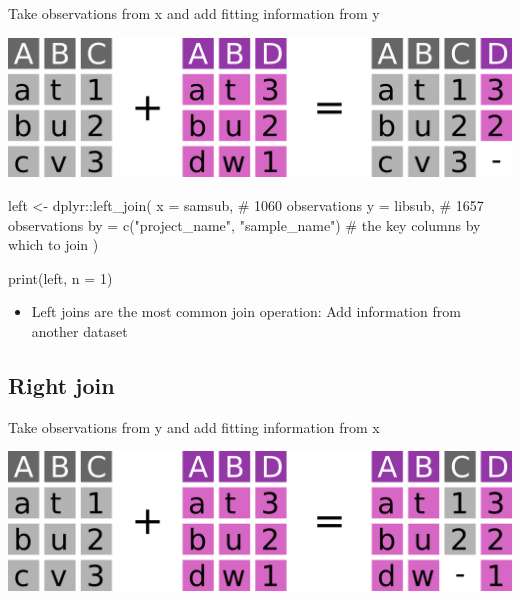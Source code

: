 \documentclass[
  letterpaper,
]{book}
\newenvironment{Shaded}{}{}
\newcommand{\AttributeTok}[1]{\textcolor[rgb]{0.84,0.23,0.29}{#1}}
\newcommand{\CommentTok}[1]{\textcolor[rgb]{0.42,0.45,0.49}{#1}}
\newcommand{\DecValTok}[1]{\textcolor[rgb]{0.00,0.36,0.77}{#1}}
\newcommand{\FunctionTok}[1]{\textcolor[rgb]{0.44,0.26,0.76}{#1}}
\newcommand{\NormalTok}[1]{\textcolor[rgb]{0.14,0.16,0.18}{#1}}
\newcommand{\OtherTok}[1]{\textcolor[rgb]{0.44,0.26,0.76}{#1}}
\newcommand{\SpecialCharTok}[1]{\textcolor[rgb]{0.00,0.36,0.77}{#1}}
\newcommand{\StringTok}[1]{\textcolor[rgb]{0.01,0.18,0.38}{#1}}
\providecommand{\tightlist}{%
  \setlength{\itemsep}{0pt}\setlength{\parskip}{0pt}}\usepackage{longtable,booktabs,array}
\begin{document}
Take observations from x and add fitting information from y

\includegraphics{assets/images/chapters/introduction-to-r/left_join.png}

\begin{Shaded}
\begin{Highlighting}[]
\NormalTok{left }\OtherTok{\textless{}{-}}\NormalTok{ dplyr}\SpecialCharTok{::}\FunctionTok{left\_join}\NormalTok{(}
\AttributeTok{x =}\NormalTok{ samsub,                           }\CommentTok{\# 1060 observations}
\AttributeTok{y =}\NormalTok{ libsub,                           }\CommentTok{\# 1657 observations}
\AttributeTok{by =} \FunctionTok{c}\NormalTok{(}\StringTok{"project\_name"}\NormalTok{, }\StringTok{"sample\_name"}\NormalTok{) }\CommentTok{\# the key columns by which to join}
\NormalTok{)}

\FunctionTok{print}\NormalTok{(left, }\AttributeTok{n =} \DecValTok{1}\NormalTok{)}
\end{Highlighting}
\end{Shaded}

\begin{itemize}
\tightlist
\item
  Left joins are the most common join operation: Add information from
  another dataset
\end{itemize}

\hypertarget{right-join}{%
\subsection{Right join}\label{right-join}}

Take observations from y and add fitting information from x

\includegraphics{assets/images/chapters/introduction-to-r/right_join.png}
\end{document}
